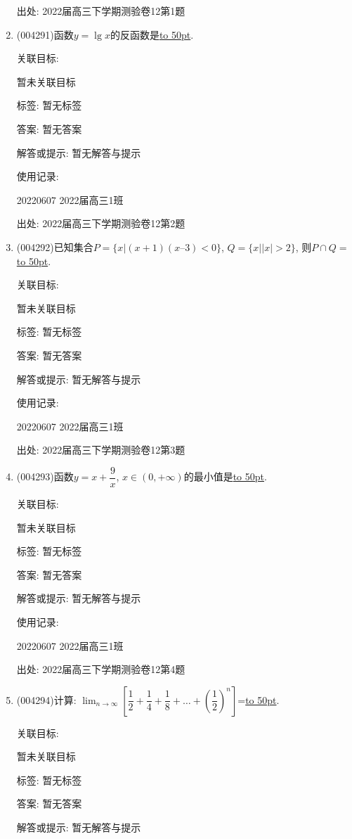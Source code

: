 \documentclass[10pt,a4paper]{article}
\newcommand{\blank}[1]{\underline{\hbox to #1pt{}}}
\begin{document}
\begin{enumerate}[1.]
出处: 2022届高三下学期测验卷12第1题
\item { (004291)}函数$y=\lg x$的反函数是\blank{50}.


关联目标:

暂未关联目标



标签: 暂无标签

答案: 暂无答案

解答或提示: 暂无解答与提示

使用记录:

20220607	2022届高三1班	


出处: 2022届高三下学期测验卷12第2题
\item { (004292)}已知集合$P=\{x|(x+1)(x–3)<0\}$, $Q=\{x||x|>2\}$, 则$P\cap Q=$\blank{50}.


关联目标:

暂未关联目标



标签: 暂无标签

答案: 暂无答案

解答或提示: 暂无解答与提示

使用记录:

20220607	2022届高三1班	


出处: 2022届高三下学期测验卷12第3题
\item { (004293)}函数$y=x+\dfrac 9x$, $x\in (0,+\infty)$的最小值是\blank{50}.


关联目标:

暂未关联目标



标签: 暂无标签

答案: 暂无答案

解答或提示: 暂无解答与提示

使用记录:

20220607	2022届高三1班	


出处: 2022届高三下学期测验卷12第4题
\item { (004294)}计算: $\displaystyle\lim_{n\to \infty}[\dfrac 12+\dfrac 14+\dfrac 18+\ldots +(\dfrac 12)^n]$=\blank{50}.


关联目标:

暂未关联目标



标签: 暂无标签

答案: 暂无答案

解答或提示: 暂无解答与提示


\end{enumerate}
\end{document}
